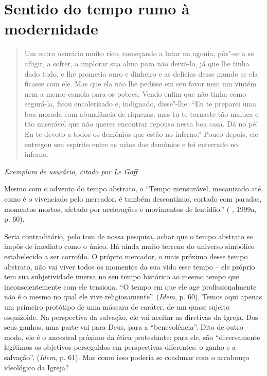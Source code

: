 \section{Sentido do tempo rumo à modernidade}

\begin{quote}
Um outro usurário muito rico, começando a lutar na agonia, pôs"-se a se
afligir, a sofrer, a implorar sua alma para não deixá-lo, já que lhe
tinha dado tudo, e lhe prometia ouro e dinheiro e as delícias desse
mundo se ela ficasse com ele. Mas que ela não lhe pedisse em seu favor
nem um vintém nem a menor esmola para os pobres. Vendo enfim que não
tinha como segurá-la, ficou encolerizado e, indignado, disse"-lhe: ``Eu
te preparei uma boa morada com abundância de riquezas, mas tu te
tornaste tão maluca e tão miserável que não queres encontrar repouso
nessa boa casa. Dá no pé! Eu te devoto a todos os demônios que estão no
inferno.'' Pouco depois, ele entregou seu espírito entre as mãos dos
demônios e foi enterrado no inferno.
\end{quote}

\emph{Exemplum} \emph{de usurário, citado por Le Goff}

Mesmo com o advento do tempo abstrato, o ``Tempo mensurável, mecanizado
até, como é o vivenciado pelo mercador, é também descontínuo, cortado
com paradas, momentos mortos, afetado por acelerações e movimentos de
lentidão.'' ( , 1999a, p. 60).

Seria contraditório, pelo tom de nossa pesquisa, achar que o tempo
abstrato se impôs de imediato como o único. Há ainda muito terreno do
universo simbólico estabelecido a ser corroído. O próprio mercador, o
mais próximo desse tempo abstrato, não vai viver todos os momentos da
sua vida esse tempo -- ele próprio tem sua subjetividade imersa no seu
tempo histórico ao mesmo tempo que inconscientemente com ele tensiona.
``O tempo em que ele age profissionalmente não é o mesmo no qual ele
vive religiosamente''. (\emph{Idem}, p. 60). Temos aqui apenas um
primeiro protótipo de uma máscara de caráter, de um quase sujeito
esquizoide. Na perspectiva da salvação, ele vai aceitar as diretivas da
Igreja. Dos seus ganhos, uma parte vai para Deus, para a
``benevolência''. Dito de outro modo, ele é o ancestral próximo da ética
protestante: para ele, são ``diversamente legítimos os objetivos
perseguidos em perspectivas diferentes: o ganho e a salvação''.
(\emph{Idem}, p. 61). Mas como isso poderia se coadunar com o arcabouço
ideológico da Igreja?


